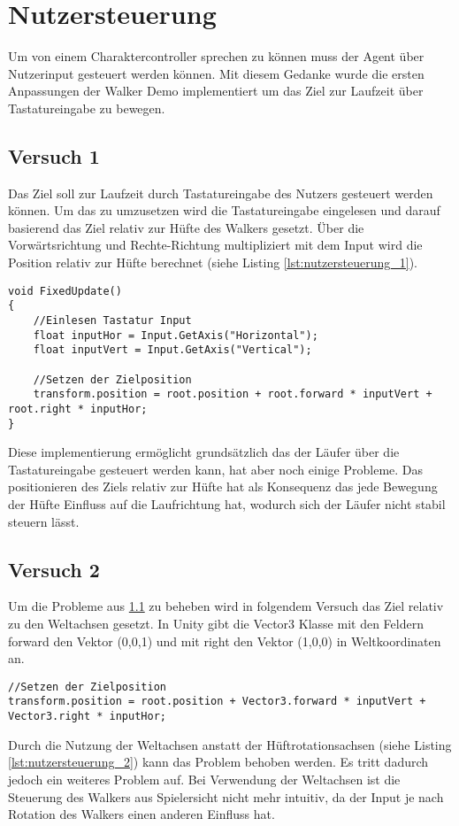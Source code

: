 \section{Nutzersteuerung}
Um von einem Charaktercontroller sprechen zu können muss der Agent über Nutzerinput gesteuert werden können. Mit diesem Gedanke wurde die ersten Anpassungen der Walker Demo implementiert um das Ziel zur Laufzeit über Tastatureingabe zu bewegen.

\subsection{Versuch 1}
\label{subsec:versuch_1}
Das Ziel soll zur Laufzeit durch Tastatureingabe des Nutzers gesteuert werden können.
Um das zu umzusetzen wird die Tastatureingabe eingelesen und darauf basierend das Ziel relativ zur Hüfte des Walkers gesetzt. Über die Vorwärtsrichtung und Rechte-Richtung multipliziert mit dem Input wird die Position relativ zur Hüfte berechnet (siehe Listing \ref{lst:nutzersteuerung_1}).
\begin{lstlisting}[caption={Nutzersteuerung erster Prototyp},captionpos=b,label={lst:nutzersteuerung_1}]
void FixedUpdate()
{
    //Einlesen Tastatur Input
    float inputHor = Input.GetAxis("Horizontal");
    float inputVert = Input.GetAxis("Vertical");
        
    //Setzen der Zielposition
    transform.position = root.position + root.forward * inputVert + root.right * inputHor;
}
\end{lstlisting}
Diese implementierung ermöglicht grundsätzlich das der Läufer über die Tastatureingabe gesteuert werden kann, hat aber noch einige Probleme. Das positionieren des Ziels relativ zur Hüfte hat als Konsequenz das jede Bewegung der Hüfte Einfluss auf die Laufrichtung hat, wodurch sich der Läufer nicht stabil steuern lässt. 

\subsection{Versuch 2}
Um die Probleme aus \ref{subsec:versuch_1} zu beheben wird in folgendem Versuch das Ziel relativ zu den Weltachsen gesetzt. In Unity gibt die Vector3 Klasse mit den Feldern forward den Vektor (0,0,1) und mit right den Vektor (1,0,0) in Weltkoordinaten an.
\begin{lstlisting}[caption={Nutzersteuerung berechnung mit Weltachsen},captionpos=b,label={lst:nutzersteuerung_2}]
//Setzen der Zielposition
transform.position = root.position + Vector3.forward * inputVert + Vector3.right * inputHor;
\end{lstlisting}
Durch die Nutzung der Weltachsen anstatt der Hüftrotationsachsen (siehe Listing \ref{lst:nutzersteuerung_2}) kann das Problem behoben werden. Es tritt dadurch jedoch ein weiteres Problem auf. Bei Verwendung der Weltachsen ist die Steuerung des Walkers aus Spielersicht nicht mehr intuitiv, da der Input je nach Rotation des Walkers einen anderen Einfluss hat.

